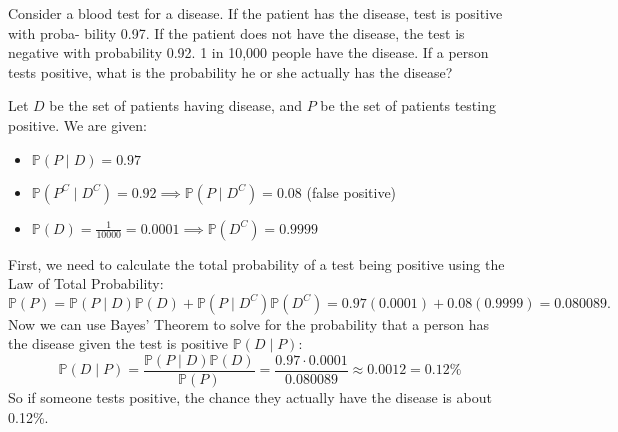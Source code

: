 \documentclass{jhwhw}
\begin{document}
    \problem{}
        Consider a blood test for a disease. If the patient has the disease, test is positive with proba-
bility 0.97. If the patient does not have the disease, the test is negative with probability 0.92.
1 in 10,000 people have the disease. If a person tests positive, what is the probability he or
she actually has the disease?

    \solution
        Let \(D\) be the set of patients having disease, and \(P\) be the set of patients testing positive. We are given:
        \begin{itemize}
            \item \(\mathbb{P}(P \mid D) = 0.97\)
            \item \(\mathbb{P}(P^C \mid D^C) = 0.92 \implies \mathbb{P}(P \mid D^C) = 0.08\) (false positive)
            \item \(\mathbb{P}(D) = \frac{1}{10000} = 0.0001 \implies \mathbb{P}(D^C) = 0.9999\)
        \end{itemize}
        First, we need to calculate the total probability of a test being positive using the Law of Total Probability: 
        \[
            \mathbb{P}(P) = \mathbb{P}(P \mid D)\mathbb{P}(D) + \mathbb{P}(P \mid D^C)\mathbb{P}(D^C) = 0.97(0.0001) + 0.08(0.9999) = 0.080089.
        \]
        Now we can use Bayes' Theorem to solve for the probability that a person has the disease given the test is positive \(\mathbb{P}(D \mid P)\):
        \[
            \mathbb{P}(D \mid P) = \frac{\mathbb{P}(P \mid D)\mathbb{P}(D)}{\mathbb{P}(P)} = \frac{0.97 \cdot 0.0001}{0.080089} \approx 0.0012 = 0.12\%
        \]
        So if someone tests positive, the chance they actually have the disease is about 0.12\%. 
\end{document}
